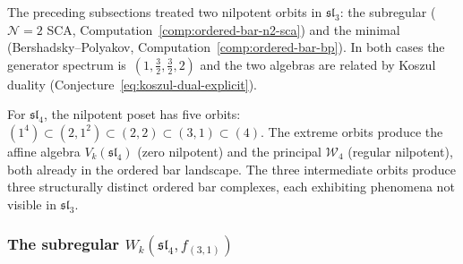 
The preceding subsections treated two nilpotent orbits in
$\mathfrak{sl}_3$: the subregular ($\mathcal N=2$ SCA,
Computation~\ref{comp:ordered-bar-n2-sca}) and the minimal
(Bershadsky--Polyakov,
Computation~\ref{comp:ordered-bar-bp}). In both cases the
generator spectrum is~$(1,\frac32,\frac32,2)$ and the two
algebras are related by Koszul duality
(Conjecture~\eqref{eq:koszul-dual-explicit}).

For $\mathfrak{sl}_4$, the nilpotent poset has five orbits:
$(1^4)\subset(2,1^2)\subset(2,2)\subset(3,1)\subset(4)$.
The extreme orbits produce the affine algebra $V_k(\mathfrak{sl}_4)$
(zero nilpotent) and the principal $\mathcal W_4$ (regular nilpotent),
both already in the ordered bar landscape. The three intermediate
orbits produce three structurally distinct ordered bar complexes,
each exhibiting phenomena not visible in $\mathfrak{sl}_3$.

\subsubsection{The subregular
$W_k(\mathfrak{sl}_4,f_{(3,1)})$}
\label{subsubsec:ordered-bar-sl4-subregular}

